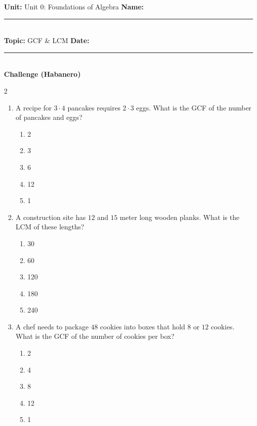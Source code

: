 \documentclass[10pt]{article}
\begin{document}
\enlargethispage{2.5cm}

\begin{tcolorbox}[colback=mainblue!5, colframe=mainblue, sharp corners, boxrule=0.5pt]
    \small \textbf{Unit:} Unit 0: Foundations of Algebra \hfill \textbf{Name:} \rule{3cm}{0.4pt} \\
    \small \textbf{Topic:} GCF & LCM \hfill \textbf{Date:} \rule{2cm}{0.4pt} \\
    \centering \textbf{\large Challenge (Habanero)}
\end{tcolorbox}

\vspace{0.2cm}

\begin{multicols}{2}
\begin{enumerate}[label=\textbf{Q\arabic*.}, leftmargin=*, itemsep=6pt, parsep=0pt]

  \item \small A recipe for $3 \cdot 4$ pancakes requires $2 \cdot 3$ eggs. What is the GCF of the number of pancakes and eggs?
  \begin{enumerate}[label=(\Alph*), leftmargin=0.6cm, nosep, itemsep=2pt]
    \item 2
    \item 3
    \item 6
    \item 12
    \item 1
  \end{enumerate}

  \item \small A construction site has $12$ and $15$ meter long wooden planks. What is the LCM of these lengths?
  \begin{enumerate}[label=(\Alph*), leftmargin=0.6cm, nosep, itemsep=2pt]
    \item 30
    \item 60
    \item 120
    \item 180
    \item 240
  \end{enumerate}

  \item \small A chef needs to package $48$ cookies into boxes that hold $8$ or $12$ cookies. What is the GCF of the number of cookies per box?
  \begin{enumerate}[label=(\Alph*), leftmargin=0.6cm, nosep, itemsep=2pt]
    \item 2
    \item 4
    \item 8
    \item 12
    \item 1
  \end{enumerate}


\end{enumerate}
\end{multicols}
\end{document}
